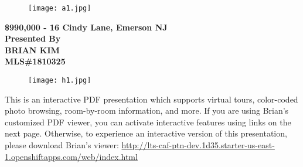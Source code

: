 \documentclass[10pt,letterpaper,twocolumn,landscape]{article}
\newcommand{\propHeader}[1]{\huge\bgroup #1\egroup}
\newcommand{\propAddress}[1]{#1}
\newcommand{\propPrice}[1]{\$\textit{#1}}
\newcommand{\propAgent}[1]{\huge\bgroup #1\egroup}
\newcommand{\mlsNumber}[1]{\Large\bgroup MLS\##1\egroup}
\newcommand{\rpdfNotice}[1]{\begin{onehalfspacing}{

\large #1

}\end{onehalfspacing}}
\newcommand{\rpdfLink}[1]{\href{#1}{\small{#1}}}
\begin{document}


\vspace{-5em}
\begin{figure}[h]
\hspace*{.35\textwidth}
\begin{minipage}{.25\textwidth}
\texttt{[image: a1.jpg]}
\end{minipage}
\end{figure}



\begin{center}
{\bf
{\propHeader \propPrice{990,000} - \propAddress{16 Cindy Lane, Emerson
NJ}}\\\vspace{12pt}
{\Large Presented By \\\vspace{12pt}}
{\propAgent BRIAN KIM\\}\vspace{12pt}
{\mlsNumber 1810325\\}
}
\end{center}

\begin{figure}[h]
\begin{center}
\texttt{[image: h1.jpg]}
\end{center}
\end{figure}

\begin{center}
{\bf
\rpdfNotice{This is an interactive PDF presentation which 
supports virtual tours, color-coded photo browsing, room-by-room 
information, and more.  If you are using Brian's customized PDF viewer, 
you can activate interactive features using links on 
the next page.  Otherwise, to experience an interactive version of this
presentation, please download Brian's viewer:
\rpdfLink{http://lts-caf-ptn-dev.1d35.starter-us-east-1.openshiftapps.com/web/index.html}
}
}
\end{center}
\end{document}
